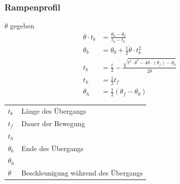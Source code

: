 \subsubsection{Rampenprofil}
\begin{minipage}{0.5\linewidth}
    {\small 
    $\ddot{\theta}$ gegeben\newline
    \begin{align*}
        \ddot{\theta}\cdot t_b &= \frac{\theta_h-\theta_b}{t_h - t_b}\\
        \theta_b &=\theta_0 + \frac{1}{2}\ddot{\theta}\cdot t_b^2\\
        t_b &= \frac{t}{2}- \frac{\sqrt{t^2\cdot \ddot{\theta}^2-4\ddot{\theta}\cdot(\theta_f)- \theta_0}}{2\ddot{\theta}}\\
        t_h &= \frac{1}{2}t_f\\
        \theta_h &=\frac{1}{2}(\theta_f -\theta_0)
    \end{align*}
    \begin{tabular}{ll}
        $t_b$ & Länge des Übergangs\\
        $t_f$ & Dauer der Bewegung\\
        $t_h$ & \\
        $\theta_b$& Ende des Übergangs\\
        $\theta_h$& \\
        $\ddot{\theta}$& Beschleunigung während des Übergangs\\
    \end{tabular}}
\end{minipage}
